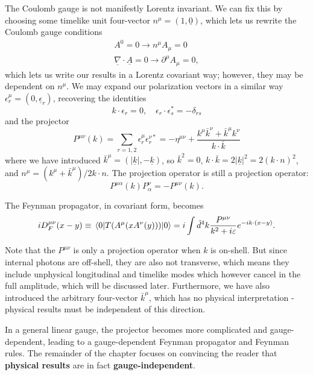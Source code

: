 \documentclass{article}
\numberwithin{equation}{section}
\begin{document}
The Coulomb gauge is not manifestly Lorentz invariant. We can fix this by choosing some timelike unit four-vector $n^\mu = (1, \underline{0})$, which lets us rewrite the Coulomb gauge conditions
\begin{gather}
    A^0 = 0 \rightarrow n^\mu A_\mu = 0 \\
    \underline{\nabla} \cdot \underline{A} = 0 \rightarrow \partial^\mu A_\mu = 0,
\end{gather}
which lets us write our results in a Lorentz covariant way; however, they may be dependent on $n^\mu$. We may expand our polarization vectors in a similar way $\epsilon_r^\mu = (0, \underline{\epsilon}_r)$, recovering the identities
\begin{equation}
    k \cdot \epsilon_r = 0, \quad
    \epsilon_r \cdot \epsilon_s^* = -\delta_{rs}
\end{equation}
and the projector
\begin{equation}
    P^{\mu\nu}(k) = \sum_{r=1, 2} \epsilon_r^\mu \epsilon_r^{\nu*} = -\eta^{\mu\nu}  + \frac{k^\mu \bar{k}^\nu + \bar{k}^\mu k^\nu}{k \cdot \bar{k}} 
\end{equation}
where we have introduced $\bar{k}^\mu = (|\underline{k}|, -\underline{k})$, so $\bar{k}^2 = 0$, $k \cdot \bar{k} = 2 |\underline{k}|^2 = 2(k \cdot n)^2$, and $n^\mu = (k^\mu + \bar{k}^\mu)/2 k \cdot n$. The projection operator is still a projection operator:
\begin{equation}
    P^{\mu\alpha}(k) P_\alpha^\nu = -P^{\mu\nu}(k).
\end{equation}

The Feynman propagator, in covariant form, becomes
\begin{equation}
    i D_F^{\mu\nu}(x-y) \equiv \ev{T(A^\mu(x A^\nu(y)))}{0} = i \int \hat{d}^4k \frac{P^{\mu\nu}}{k^2 +i\varepsilon} e^{-ik \cdot (x-y)}.
\end{equation}

Note that the $P^{\mu\nu}$ is only a projection operator when $k$ is on-shell. But since internal photons are off-shell, they are also not transverse, which means they include unphysical longitudinal and timelike modes which however cancel in the full amplitude, which will be discussed later. Furthermore, we have also introduced the arbitrary four-vector $\bar{k}^\mu$, which has no physical interpretation - physical results must be independent of this direction.

In a general linear gauge, the projector becomes more complicated and gauge-dependent, leading to a gauge-dependent Feynman propagator and Feynman rules. The remainder of the chapter focuses on convincing the reader that \textbf{physical results} are in fact \textbf{gauge-independent}.
\end{document}

